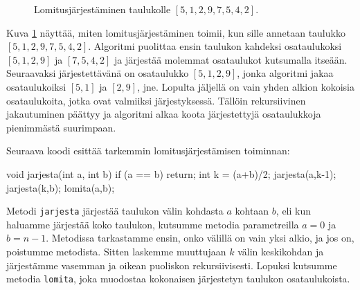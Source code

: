 \begin{figure}
\caption{Lomitusjärjestäminen taulukolle $[5,1,2,9,7,5,4,2]$.}
\label{fig:lomjar}
\end{figure}

Kuva \ref{fig:lomjar} näyttää, miten lomitusjärjestäminen
toimii, kun sille annetaan taulukko $[5,1,2,9,7,5,4,2]$.
Algoritmi puolittaa ensin taulukon kahdeksi osataulukoksi
$[5,1,2,9]$ ja $[7,5,4,2]$ ja järjestää molemmat
osataulukot kutsumalla itseään.
Seuraavaksi järjestettävänä on osataulukko $[5,1,2,9]$,
jonka algoritmi jakaa osataulukoiksi $[5,1]$ ja $[2,9]$, jne.
Lopulta jäljellä on vain yhden alkion kokoisia
osataulukoita, jotka ovat valmiiksi järjestyksessä.
Tällöin rekursiivinen jakautuminen päättyy ja algoritmi
alkaa koota järjestettyjä osataulukkoja pienimmästä suurimpaan.

Seuraava koodi esittää tarkemmin lomitusjärjestämisen toiminnan:

\begin{code}
void jarjesta(int a, int b) {
    if (a == b) return;
    int k = (a+b)/2;
    jarjesta(a,k-1);
    jarjesta(k,b);
    lomita(a,b);
}
\end{code}

Metodi \texttt{jarjesta} järjestää taulukon välin kohdasta
$a$ kohtaan $b$, eli kun haluamme järjestää koko taulukon,
kutsumme metodia parametreilla $a=0$ ja $b=n-1$.
Metodissa tarkastamme ensin, onko välillä on vain yksi alkio,
ja jos on, poistumme metodista.
Sitten laskemme muuttujaan $k$ välin keskikohdan
ja järjestämme vasemman ja oikean puoliskon rekursiivisesti.
Lopuksi kutsumme metodia \texttt{lomita},
joka muodostaa kokonaisen järjestetyn taulukon osataulukoista.


